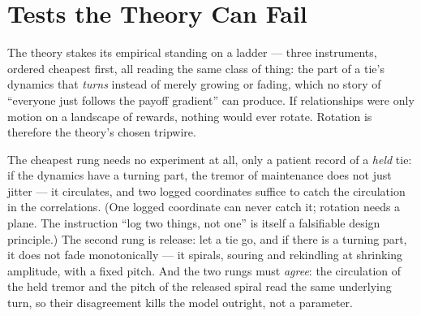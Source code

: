 \section{Tests the Theory Can Fail}
\label{sec:explainer:falsifier}

The theory stakes its empirical standing on a ladder --- three instruments, ordered cheapest first, all reading the same class of thing: the part of a tie's dynamics that \emph{turns} instead of merely growing or fading, which no story of ``everyone just follows the payoff gradient'' can produce. If relationships were only motion on a landscape of rewards, nothing would ever rotate. Rotation is therefore the theory's chosen tripwire.

The cheapest rung needs no experiment at all, only a patient record of a \emph{held} tie: if the dynamics have a turning part, the tremor of maintenance does not just jitter --- it circulates, and two logged coordinates suffice to catch the circulation in the correlations. (One logged coordinate can never catch it; rotation needs a plane. The instruction ``log two things, not one'' is itself a falsifiable design principle.) The second rung is release: let a tie go, and if there is a turning part, it does not fade monotonically --- it spirals, souring and rekindling at shrinking amplitude, with a fixed pitch. And the two rungs must \emph{agree}: the circulation of the held tremor and the pitch of the released spiral read the same underlying turn, so their disagreement kills the model outright, not a parameter.
\par
